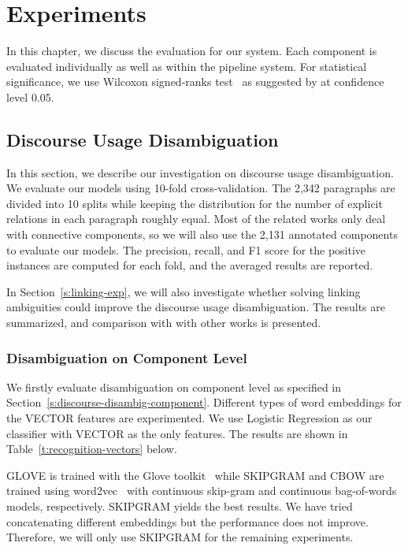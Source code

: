 %
%
%
\chapter{Experiments}
\label{c:exp}

In this chapter, we discuss the evaluation for our system. Each component
is evaluated individually as well as within the pipeline system. For
statistical significance, we use Wilcoxon signed-ranks test~\citep{wilcoxon1945individual}
as suggested by \cite{demvsar2006statistical} at confidence level 0.05.

\section{Discourse Usage Disambiguation}
\label{s:discourse-usage-exp}

In this section, we describe our investigation
on discourse usage disambiguation. We evaluate our models using
10-fold cross-validation. The 2,342 paragraphs are divided  into 10 splits
while keeping the distribution for the number of explicit relations
in each paragraph roughly equal. Most of the related works only
deal with connective components, so we will also use the 2,131 annotated
components to evaluate our models.
The precision, recall, and F1 score for the positive instances are computed
for each fold, and the averaged results are reported.

In Section~\ref{s:linking-exp}, we will also investigate whether solving linking
ambiguities could improve the discourse usage disambiguation. The results
are summarized, and comparison with with other works is presented.


\subsection{Disambiguation on Component Level}

We firstly evaluate disambiguation on component level as specified in
Section~\ref{s:discourse-disambig-component}.  
Different types of word embeddings for
the VECTOR features are experimented. We use Logistic Regression
as our classifier with VECTOR as the only features. The results are
shown in Table~\ref{t:recognition-vectors} below. 



GLOVE is trained with the Glove toolkit~\citep{pennington2014glove}
while SKIPGRAM and CBOW are trained using word2vec~\citep{mikolov2013efficient} with
continuous skip-gram and continuous bag-of-words models,
respectively. SKIPGRAM yields the best results.
We have tried concatenating different embeddings
but the performance does not improve. Therefore, we will only use SKIPGRAM
for the remaining experiments.

